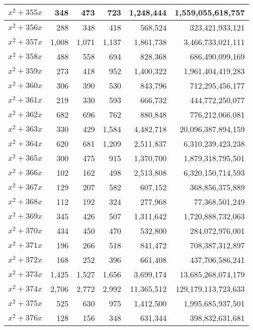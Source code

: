 \documentclass[a4paper]{amsproc}
\theoremstyle{plain}
\theoremstyle{named}
\begin{document}
\begin{longtable}{ | l | r | r | r | r | r | }
$x^2 + 355x$ & 348 & 473 & 723 & 1{,}248{,}444 & 1{,}559{,}055{,}618{,}757 \\ \hline
$x^2 + 356x$ & 288 & 348 & 418 & 568{,}524 & 323{,}421{,}933{,}121 \\ \hline
$x^2 + 357x$ & 1{,}008 & 1{,}071 & 1{,}137 & 1{,}861{,}738 & 3{,}466{,}733{,}021{,}111 \\ \hline
$x^2 + 358x$ & 488 & 558 & 694 & 828{,}368 & 686{,}490{,}099{,}169 \\ \hline
$x^2 + 359x$ & 273 & 418 & 952 & 1{,}400{,}322 & 1{,}961{,}404{,}419{,}283 \\ \hline
$x^2 + 360x$ & 306 & 390 & 530 & 843{,}796 & 712{,}295{,}456{,}177 \\ \hline
$x^2 + 361x$ & 219 & 330 & 593 & 666{,}732 & 444{,}772{,}250{,}077 \\ \hline
$x^2 + 362x$ & 682 & 696 & 762 & 880{,}848 & 776{,}212{,}066{,}081 \\ \hline
$x^2 + 363x$ & 330 & 429 & 1{,}584 & 4{,}482{,}718 & 20{,}096{,}387{,}894{,}159 \\ \hline
$x^2 + 364x$ & 620 & 681 & 1{,}209 & 2{,}511{,}837 & 6{,}310{,}239{,}423{,}238 \\ \hline
$x^2 + 365x$ & 300 & 475 & 915 & 1{,}370{,}700 & 1{,}879{,}318{,}795{,}501 \\ \hline
$x^2 + 366x$ & 102 & 162 & 498 & 2{,}513{,}808 & 6{,}320{,}150{,}714{,}593 \\ \hline
$x^2 + 367x$ & 129 & 207 & 582 & 607{,}152 & 368{,}856{,}375{,}889 \\ \hline
$x^2 + 368x$ & 112 & 192 & 324 & 277{,}968 & 77{,}368{,}501{,}249 \\ \hline
$x^2 + 369x$ & 345 & 426 & 507 & 1{,}311{,}642 & 1{,}720{,}888{,}732{,}063 \\ \hline
$x^2 + 370x$ & 434 & 450 & 470 & 532{,}800 & 284{,}072{,}976{,}001 \\ \hline
$x^2 + 371x$ & 196 & 266 & 518 & 841{,}472 & 708{,}387{,}312{,}897 \\ \hline
$x^2 + 372x$ & 168 & 252 & 396 & 661{,}408 & 437{,}706{,}586{,}241 \\ \hline
$x^2 + 373x$ & 1{,}425 & 1{,}527 & 1{,}656 & 3{,}699{,}174 & 13{,}685{,}268{,}074{,}179 \\ \hline
$x^2 + 374x$ & 2{,}706 & 2{,}772 & 2{,}992 & 11{,}365{,}512 & 129{,}179{,}113{,}723{,}633 \\ \hline
$x^2 + 375x$ & 525 & 630 & 975 & 1{,}412{,}500 & 1{,}995{,}685{,}937{,}501 \\ \hline
$x^2 + 376x$ & 128 & 156 & 348 & 631{,}344 & 398{,}832{,}631{,}681 \\ \hline

\end{longtable}
\end{document}
